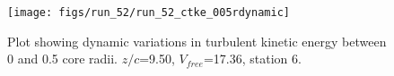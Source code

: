 \begin{figure}[H]
\centering
\texttt{[image: figs/run\_52/run\_52\_ctke\_005rdynamic]}
\caption{Plot showing dynamic variations in turbulent kinetic energy between 0 and 0.5 core radii. $z/c$=9.50, $V_{free}$=17.36, station 6.}
\label{fig:run_52_ctke_005rdynamic}
\end{figure}



